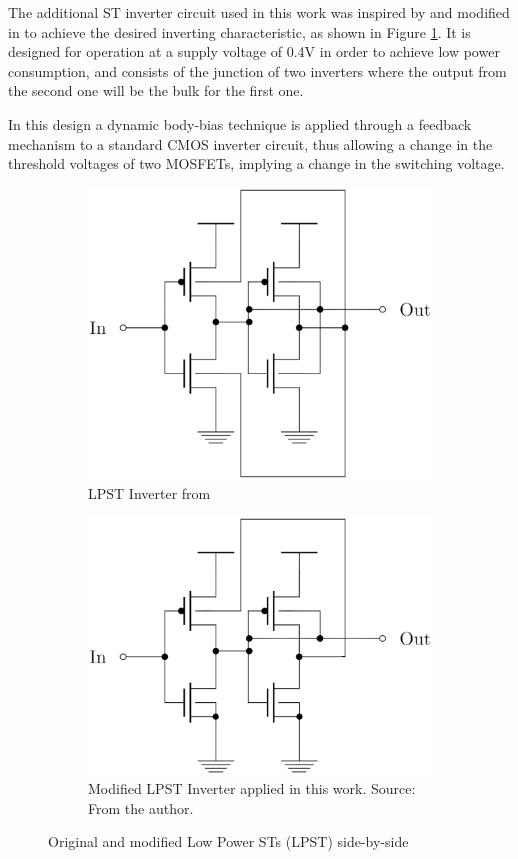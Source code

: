 \documentclass[pgmicro,mestrado,english]{iiufrgs}
\begin{document}
The additional ST inverter circuit used in this work was inspired by \cite{zhang2003low} and modified in \cite{dokania2015circuit} to achieve the desired inverting characteristic, as shown in Figure \ref{fig:sub1}. It is designed for operation at a supply voltage of 0.4V in order to achieve low power consumption, and consists of the junction of two inverters where the output from the second one will be the bulk for the first one.  

In this design a dynamic body-bias technique is applied through a feedback mechanism to a standard CMOS inverter circuit, thus allowing a change in the threshold voltages of two MOSFETs, implying a change in the switching voltage. 

\begin{figure}[H]
\centering
\begin{subfigure}{.5\textwidth}
  \centering
  \includegraphics[width=.8\linewidth]{STOriginal.eps}
  \caption{LPST Inverter from \citet{dokania2015circuit}}
  \label{fig:sub1}
\end{subfigure}%
\begin{subfigure}{.5\textwidth}
  \centering
  \includegraphics[width=.8\linewidth]{STcorrigido.eps}
  \caption{Modified LPST Inverter applied in this work. Source: From the author.}
  \label{fig:sub2}
\end{subfigure}
\caption{Original and modified Low Power STs (LPST) side-by-side}
\label{fig:test}
\end{figure}
\end{document}
